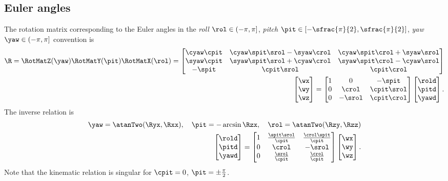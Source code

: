 \subsection{Euler angles}
The rotation matrix corresponding to the Euler angles in the \textit{roll} $\rol\in (-\pi,\pi]$, \textit{pitch} $\pit\in [-\sfrac{\pi}{2},\sfrac{\pi}{2}]$, \textit{yaw} $\yaw\in (-\pi,\pi]$ convention is
\begin{align}
 \R
 = \RotMatZ(\yaw) \RotMatY(\pit) \RotMatX(\rol) = 
 \begin{bmatrix}
  \cyaw \cpit & \cyaw \spit \srol - \syaw \crol & \cyaw \spit \crol + \syaw \srol \\
  \syaw \cpit & \syaw \spit \srol + \cyaw \crol & \syaw \spit \crol - \cyaw \srol \\
  -\spit & \cpit \srol & \cpit \crol
 \end{bmatrix}
\\
 \begin{bmatrix} \wx \\ \wy \\ \wz \end{bmatrix}
 =
 \begin{bmatrix}
  1 & 0 & -\spit \\
  0 & \crol & \cpit \srol \\
  0 & -\srol & \cpit \crol
 \end{bmatrix}
 \begin{bmatrix} \rold \\ \pitd \\ \yawd \end{bmatrix}
 .
\end{align}
The inverse relation is
\begin{align}
 \yaw = \atanTwo(\Ryx, \Rxx),
\quad
 \pit = -\arcsin \Rzx,
\quad
 \rol = \atanTwo(\Rzy, \Rzz)
\\
 \begin{bmatrix} \rold \\ \pitd \\ \yawd \end{bmatrix}
 =
 \begin{bmatrix}
  1 & \tfrac{\spit \srol}{\cpit} & \tfrac{\crol \spit}{\cpit} \\
  0 & \crol & -\srol \\
  0 & \tfrac{\srol}{\cpit} & \tfrac{\crol}{\cpit}
 \end{bmatrix}
 \begin{bmatrix} \wx \\ \wy \\ \wz \end{bmatrix}
 .
\end{align}
Note that the kinematic relation is singular for $\cpit = 0$, \ie $\pit = \pm\tfrac{\pi}{2}$.


